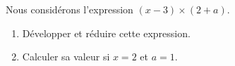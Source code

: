 
\begin{exercice}\label{exo2smath-0233}

    Nous considérons l'expression \( (x-3)\times (2+a)\).
    \begin{enumerate}
        \item
            Développer et réduire cette expression.
        \item
            Calculer sa valeur si \( x=2\) et \( a=1\).
    \end{enumerate}

\end{exercice}
